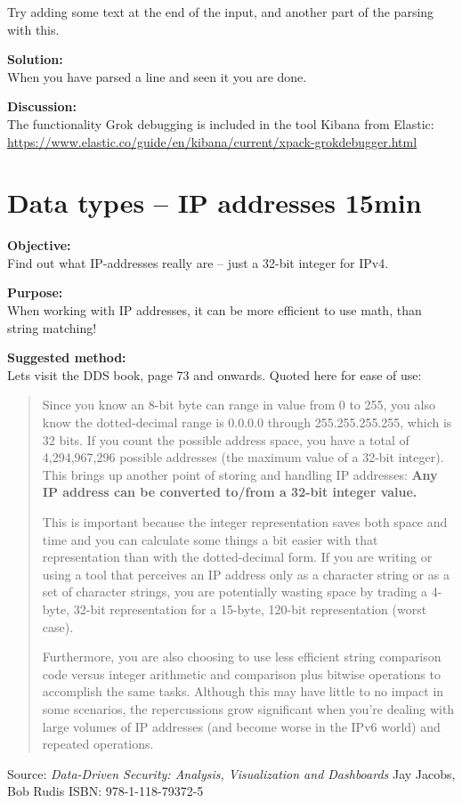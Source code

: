 \documentclass[a4paper,11pt,notitlepage]{report}
\begin{document}
Try adding some text at the end of the input, and another part of the parsing with this.

{\bf Solution:}\\
When you have parsed a line and seen it you are done.

{\bf Discussion:}\\
The functionality Grok debugging is included in the tool Kibana from Elastic:\\
\url{https://www.elastic.co/guide/en/kibana/current/xpack-grokdebugger.html}





\chapter{Data types -- IP addresses 15min}
\label{ex:data-types-ip-address}

{\bf Objective:}\\
Find out what IP-addresses really are -- just a 32-bit integer for IPv4.


{\bf Purpose:}\\
When working with IP addresses, it can be more efficient to use math, than string matching!


{\bf Suggested method:}\\
Lets visit the DDS book, page 73 and onwards. Quoted here for ease of use:


\begin{quote}
Since you know an 8-bit byte can range in value from 0 to 255, you also know the dotted-decimal range is 0.0.0.0 through 255.255.255.255, which is 32 bits. If you count the possible address space, you have a total of 4,294,967,296 possible addresses (the maximum value of a 32-bit integer). This brings up another point of storing and handling IP addresses: {\bf Any IP address can be converted to/from a 32-bit integer value.}

This is important because the integer representation saves both space and time and you can calculate some things a bit easier with that representation than with the dotted-decimal form. If you are writing or using a tool that perceives an IP address only as a character string or as a set of character strings, you are potentially wasting space by trading a 4-byte, 32-bit representation for a 15-byte, 120-bit representation (worst case).

Furthermore, you are also choosing to use less efficient string comparison code versus integer arithmetic and comparison plus bitwise operations to accomplish the same tasks. Although this may have little to no impact in some scenarios, the repercussions grow significant when you’re dealing with large volumes of IP addresses (and become worse in the IPv6 world) and repeated operations.
\end{quote}
Source: \emph{Data-Driven Security: Analysis, Visualization and Dashboards} Jay Jacobs, Bob Rudis  ISBN: 978-1-118-79372-5
\end{document}

